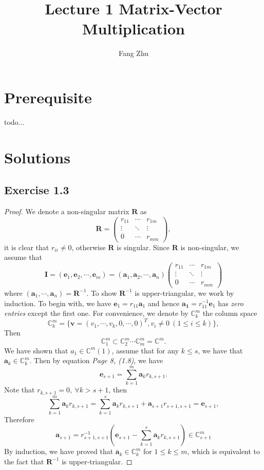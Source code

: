 \documentclass{article}
\author{Fang Zhu}
\title{Lecture 1 Matrix-Vector Multiplication}
\renewcommand{\vec}[1]{\mathbf{#1}}
\begin{document}
	\maketitle

\section{Prerequisite}
todo...

\section{Solutions}
\subsection{Exercise 1.3}
    \begin{proof}
    We denote a non-singular matrix $\bm{R}$ as
    $$
    \bm{R} = \left(\begin{array}{ccc}
         r_{11} & \cdots & r_{1m}  \\
         \vdots & \ddots & \vdots \\
         0 & \cdots & r_{mm}
    \end{array}\right),
    $$
    it is clear that $r_{ii} \neq 0$, otherwise $\bm{R}$ is singular. Since $\bm{R}$ is non-singular, we assume that
    \[ \bm{I} = (\bm{e}_1, \bm{e}_2, \cdots, \bm{e}_{m}) = (\bm{a}_1, \bm{a}_2, \cdots, \bm{a}_n)\left(\begin{array}{ccc}
         r_{11} & \cdots & r_{1m}  \\
         \vdots & \ddots & \vdots \\
         0 & \cdots & r_{mm}
    \end{array}\right)
    \]
    where $(\bm{a}_1, \cdots, \bm{a}_n) = \bm{R}^{-1}$. To show $\bm{R}^{-1}$ is upper-triangular, we work by induction. To begin with, we have $\bm{e}_1 = r_{11} \bm{a}_1$ and hence $\bm{a_1} = r_{11}^{-1} \vec{e}_1$ has \textit{zero entries} except the first one. For convenience, we denote by $\mathbb{C}^{m}_{k}$ the column space
    \[ \mathbb{C}_{k}^{m} = \{ \bm{v} = (v_1, \cdots, v_{k}, 0,\cdots, 0)^{T}, v_{i} \neq 0 ~(1\leq i \leq k)\}, \]
    Then
    \[ \mathbb{C}^{m}_1 \subset \mathbb{C}^{m}_{2} \cdots \mathbb{C}^{m}_{m}  = \mathbb{C}^{m}. \]
    We have shown that $a_1 \in \mathbb{C}^{m}(1)$, assume that for any $k \leq s$, we have that $\mathbf{a}_k \in \mathbb{C}^{m}_{k}$. Then by equation \textit{Page 8, (1.8)}, we have
    \[\bm{e}_{s+1} = \sum_{k=1}^{m} \bm{a}_k r_{k,s+1}.\]
    Note that $r_{k,s+1} = 0, ~\forall k > s+1$, then
    \[ \sum_{k=1}^{m} \bm{a}_k r_{k, s+1} = \sum_{k = 1}^{s} \bm{a}_k r_{k, s+1} + \bm{a}_{s+1} r_{s+1, s+1} = \bm{e}_{s+1},\]
    Therefore
    \[ \bm{a}_{s+1} = r_{s+1,s+1}^{-1} (\vec{e}_{s+1} - \sum_{k=1}^{s} \bm{a}_{k} r_{k,s+1}) \in \mathbb{C}^{m}_{s+1}\]
    By induction, we have proved that $\bm{a}_{k} \in \mathbb{C}^{m}_{k}$ for $1 \leq k \leq m$, which is equivalent to the fact that $\bm{R}^{-1}$ is upper-triangular.
    \end{proof}
\end{document}
